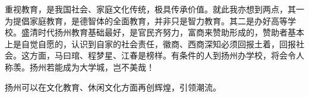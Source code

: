 重视教育，是我国社会、家庭文化传统，极具传承价值。就此我亦想到两点，其一为提倡家庭教育，是德智体的全面教育，并非只是智力教育。其二是办好高等学校。盛清时代扬州教育基础最好，是官民齐努力，富商来赞助形成的，赞助者基本上是自觉自愿的，认识到自家的社会责任，徽商、西商深知必须回报土着，回报社会。这方面，马曰琯、程梦星、江春是榜样。有条件的人到扬州办学校，将会令人称羡。扬州若能成为大学城，岂不美哉！

扬州可以在文化教育、休闲文化方面再创辉煌，引领潮流。

\vfill
\begin{BookNotes}
\end{BookNotes}
